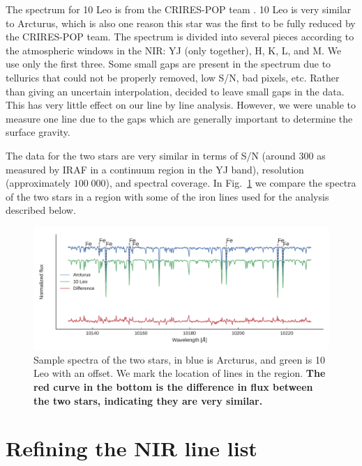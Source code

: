 \documentclass{aa}
\begin{document}
The spectrum for 10 Leo is from the CRIRES-POP team \citep{Nicholls2017}. 10 Leo
is very similar to Arcturus, which is also one reason this star was the first to
be fully reduced by the CRIRES-POP team. The spectrum is divided into several
pieces according to the atmospheric windows in the NIR: YJ (only together), H,
K, L, and M. We use only the first three. Some small gaps are present in the
spectrum due to tellurics that could not be properly removed, low S/N, bad
pixels, etc. Rather than giving an uncertain interpolation, \citet{Nicholls2017}
decided to leave small gaps in the data. This has very little effect on our line
by line analysis. However, we were unable to measure one  line due
to the gaps which are generally important to determine the surface gravity.

The data for the two stars are very similar in terms of S/N (around 300 as
measured by IRAF in a continuum region in the YJ band), resolution
(approximately $100\;000$), and spectral coverage. In Fig.~\ref{fig:both} we
compare the spectra of the two stars in a region with some of the iron lines
used for the analysis described below.

\begin{figure}[htpb!]
    \centering
    \includegraphics[width=1.0\linewidth]{figures/bothspectra.pdf}
    \caption{Sample spectra of the two stars, in blue is Arcturus, and green is
             10 Leo with an offset. We mark the location of  lines in
             the region. {\bf The red curve in the bottom is the difference in
             flux between the two stars, indicating they are very similar.}}
    \label{fig:both}
\end{figure}





\section{Refining the NIR line list}
\label{sec:refining_the_line_list}
\end{document}
